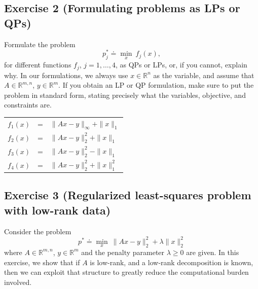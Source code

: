\documentclass[11pt]{article}
\begin{document}
\newpage
\subsection*{Exercise 2 (Formulating problems as LPs or QPs)}

Formulate the problem
\[
p_j^* \doteq \min_x \: f_j(x),
\]
for different functions $f_j$, $j=1,\ldots,4$, as QPs or LPs, or, if you cannot, explain why.
In our formulations, we always use $x \in \mathbb{R}^{n}$ as the variable, and assume that $A \in \mathbb{R}^{m,n}$, $y \in \mathbb{R}^{m}$. If you obtain an LP or QP formulation, make sure to put the problem in standard form, stating precisely what the variables, objective, and constraints are.
\begin{center}
\begin{tabular}{rcl}
$f_1(x)$  &=& $\|Ax-y\|_\infty +\|x\|_1$ \\
$f_2(x)$  &=& $\|Ax-y\|_2^2 + \|x\|_1$ \\
$f_3(x)$  &=& $\|Ax-y\|_2^2 - \|x\|_1$ \\
$f_4(x)$  &=& $\|Ax-y\|_2^2 + \|x\|_1^2$
\end{tabular}
\end{center}

\begin{solution}
\end{solution}

\newpage
\subsection*{Exercise 3 (Regularized least-squares problem with low-rank data)}

Consider the problem
\[
p^* \doteq \min_{x} \: \|Ax - y\|_2^2+ \lambda \|x\|_2^2
\]
where $A \in \mathbb{R}^{m,n}$, $y \in \mathbb{R}^{m}$ and the penalty parameter $\lambda \ge 0$ are given. In this exercise, we show that if $A$ is low-rank, and a low-rank decomposition is known, then we can exploit that structure to greatly reduce the computational burden involved.
\end{document}
